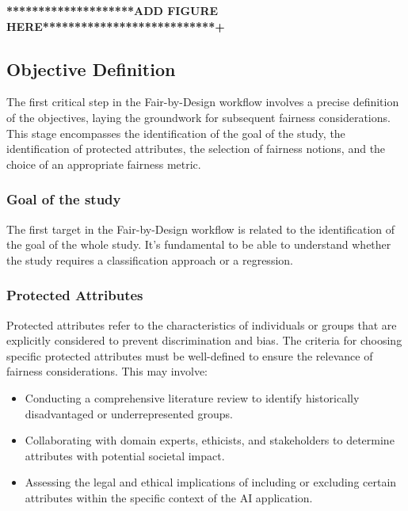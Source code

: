 \textbf{********************ADD FIGURE HERE***************************+}

\subsection{Objective Definition}
\label{subsection:objective}

The first critical step in the Fair-by-Design workflow involves a precise definition of the objectives, laying the groundwork for subsequent fairness considerations. This stage encompasses the identification of the goal of the study, the identification of protected attributes, the selection of fairness notions, and the choice of an appropriate fairness metric.

\subsubsection{Goal of the study}

The first target in the Fair-by-Design workflow is related to the identification of the goal of the whole study. It's fundamental to be able to understand whether the study requires a classification approach or a regression.


\subsubsection{Protected Attributes}

Protected attributes refer to the characteristics of individuals or groups that are explicitly considered to prevent discrimination and bias. The criteria for choosing specific protected attributes must be well-defined to ensure the relevance of fairness considerations. This may involve:

\begin{itemize}

    \item Conducting a comprehensive literature review to identify historically disadvantaged or underrepresented groups.
    
    \item Collaborating with domain experts, ethicists, and stakeholders to determine attributes with potential societal impact.
    
    \item Assessing the legal and ethical implications of including or excluding certain attributes within the specific context of the AI application.

\end{itemize}


